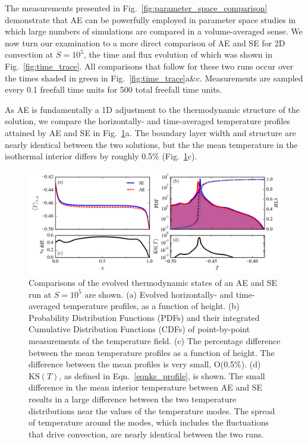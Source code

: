 \documentclass[aps, pre, onecolumn, nofootinbib, notitlepage, groupedaddress, amsfonts, amssymb, amsmath, longbibliography]{revtex4-1}
\newcommand{\KS}[1]{\ensuremath{\text{KS}(#1)}}
\begin{document}
The measurements presented in Fig.~\ref{fig:parameter_space_comparison} demonstrate
that AE can be powerfully employed in parameter space studies in which
large numbers of simulations are compared in a volume-averaged sense.  We now turn
our examination to a more direct comparison of AE and SE for 2D convection at
$S = 10^5$, the time and flux evolution of which was shown in Fig.~\ref{fig:time_trace}.
All comparisons that follow for these two runs occur over the times shaded in
green in Fig.~\ref{fig:time_trace}a\&c. Measurements are sampled every
0.1 freefall time units for 500 total freefall time units.

As AE is fundamentally a 1D adjustment to the thermodynamic structure of the
solution, we compare the horizontally- and time-averaged temperature profiles 
attained by AE and SE in Fig.~\ref{fig:temp_comparison}a.  
The boundary layer width and structure are  
nearly identical between the two solutions, but the
the mean temperature in the isothermal interior differs by roughly 0.5\%
(Fig.~\ref{fig:temp_comparison}c). 

\begin{figure}[t]
\includegraphics[width=\textwidth]{./figs/temp_comparison.png}
\caption{Comparisons of the evolved thermodynamic states of an AE and SE run
at $S = 10^{5}$ are shown.  (a) Evolved horizontally- and time-averaged 
temperature profiles, as a function of height.
(b) Probability Distribution Functions (PDFs) and their integrated
Cumulative Distribution Functions (CDFs)
of point-by-point measurements of the temperature field.
(c) The percentage difference between the mean temperature profiles as a function of height.
The difference between the mean profiles is very small, O(0.5\%).
(d) $\KS{T}$, as defined in Eqn.~\ref{eqnks_profile}, is shown. The small
difference in the mean interior temperature between AE and SE
results in a large difference between the two temperature distributions near the values
of the temperature modes.  The spread of temperature around the modes, which includes the 
fluctuations that drive convection, are nearly identical between the two runs.
\label{fig:temp_comparison} }
\end{figure}
\end{document}
